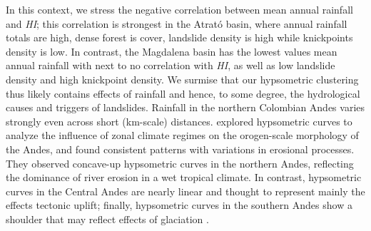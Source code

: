 \documentclass[draft]{agujournal2019}
\begin{document}
\par In this context, we stress the negative correlation between mean annual rainfall and \textit{HI}; this correlation is strongest in the Atrató basin, where annual rainfall totals are high, dense forest is cover, landslide density is high while knickpoints density is low. In contrast, the Magdalena basin has the lowest values mean annual rainfall with next to no correlation with \textit{HI}, as well as low landslide density and high knickpoint density. We surmise that our hypsometric clustering thus likely contains effects of rainfall and hence, to some degree, the hydrological causes and triggers of landslides. Rainfall in the northern Colombian Andes varies strongly even across short (km-scale) distances. \cite{montgomery2001climate} explored hypsometric curves to analyze the influence of zonal climate regimes on the orogen-scale morphology of the Andes, and found consistent patterns with variations in erosional processes. They observed concave-up hypsometric curves in the northern Andes, reﬂecting the dominance of river erosion in a wet tropical climate. In contrast, hypsometric curves in the Central Andes are nearly linear and thought to represent mainly the effects tectonic uplift; finally, hypsometric curves in the southern Andes show a shoulder that may reflect effects of glaciation \cite{montgomery2001climate}.
\end{document}
